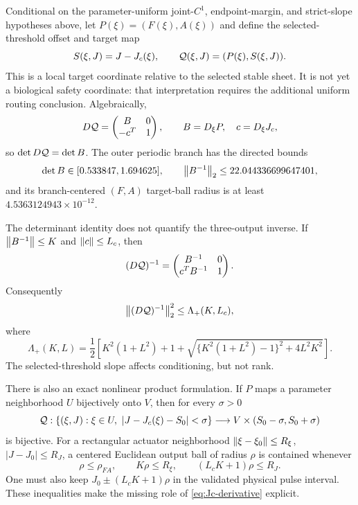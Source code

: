 Conditional on the parameter-uniform joint-\(C^1\), endpoint-margin, and
strict-slope hypotheses above, let \(P(\xi)=(F(\xi),A(\xi))\) and define the
selected-threshold offset and target map
\[
 S(\xi,J)=J-J_c(\xi),\qquad
 \mathcal Q(\xi,J)=(P(\xi),S(\xi,J)).
\]
This is a local target coordinate relative to the selected stable sheet.  It
is not yet a biological safety coordinate: that interpretation requires the
additional uniform routing conclusion.  Algebraically,
\begin{equation}
 D\mathcal Q=
 \begin{pmatrix}B&0\\-c^T&1\end{pmatrix},
 \qquad B=D_\xi P,\quad c=D_\xi J_c,                   \label{eq:block-control}
\end{equation}
so \(\det D\mathcal Q=\det B\).  The outer periodic branch has the directed bounds
\begin{equation}
 \det B\in[0.533847,1.694625],\qquad
 \left\lVert B^{-1}\right\rVert_2\le22.044336699647401,                 \label{eq:outer-response}
\end{equation}
and its branch-centered \((F,A)\) target-ball radius is at least
\(4.5363124943\times10^{-12}\).

The determinant identity does not quantify the three-output inverse.  If
\(\left\lVert B^{-1}\right\rVert\le K\) and \(\left\lVert c\right\rVert\le L_c\), then
\[
 (D\mathcal Q)^{-1}
 =\begin{pmatrix}B^{-1}&0\\c^TB^{-1}&1\end{pmatrix}.
\]
Consequently
\begin{equation}
 \left\lVert(D\mathcal Q)^{-1}\right\rVert_2^2\le\Lambda_+(K,L_c),            \label{eq:shear-bound}
\end{equation}
where
\[
 \Lambda_+(K,L)
 =\frac12\left[
 K^2(1+L^2)+1+
 \sqrt{\{K^2(1+L^2)-1\}^2+4L^2K^2}
 \right].
\]
The selected-threshold slope affects conditioning, but not rank.

There is also an exact nonlinear product formulation.  If \(P\) maps a
parameter neighborhood \(U\) bijectively onto \(V\), then for every
\(\sigma>0\)
\begin{equation}
 \mathcal Q:
 \{(\xi,J):\xi\in U,\ |J-J_c(\xi)-S_0|<\sigma\}
 \longrightarrow V\times(S_0-\sigma,S_0+\sigma)       \label{eq:adapted-product}
\end{equation}
is bijective.  For a rectangular actuator neighborhood
\(\left\lVert\xi-\xi_0\right\rVert\le R_\xi\), \(|J-J_0|\le R_J\), a centered Euclidean
output ball of radius \(\rho\) is contained whenever
\begin{equation}
 \rho\le\rho_{FA},\qquad
 K\rho\le R_\xi,\qquad
 (L_cK+1)\rho\le R_J.                                  \label{eq:hardware-product}
\end{equation}
One must also keep \(J_0\pm(L_cK+1)\rho\) in the validated physical pulse
interval.  These inequalities make the missing role of
\cref{eq:Jc-derivative} explicit.

